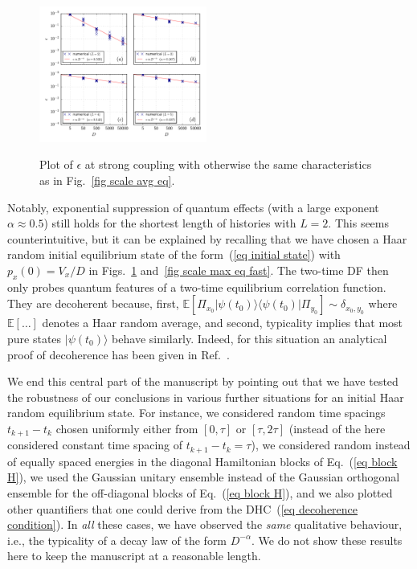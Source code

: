 \documentclass[pre,twocolumn,10pt,aps,longbibliography,nofootinbib]{revtex4-1}
\newcommand{\rl}[0]{{\rangle\langle}}
\newcommand{\new}[1]{#1}
\begin{document}
\begin{figure}[t]
 \centering\includegraphics[width=0.49\textwidth,clip=true]{eps_1_eq.pdf}
 \label{fig scale avg eq fast}\vspace{-0.5cm}
 \caption{Plot of $\epsilon$ at strong coupling with otherwise the same characteristics as in Fig.~\ref{fig scale avg eq}. }
\end{figure}

Notably, exponential suppression of quantum effects (with a large exponent $\alpha\approx0.5$) still
holds for the shortest length of histories with $L=2$. This seems counterintuitive, but it can be explained by
recalling that we have chosen a Haar random initial equilibrium state of the form~(\ref{eq initial state}) with
$p_x(0) = V_x/D$ in Figs.~\ref{fig scale avg eq fast} and~\ref{fig scale max eq fast}.
The two-time DF then only probes quantum features of a two-time equilibrium correlation function. They are \new{decoherent} because, first, $\mathbb{E}[\Pi_{x_0}|\psi(t_0)\rl\psi(t_0)|\Pi_{y_0}] \sim \delta_{x_0,y_0}$ where
$\mathbb{E}[\dots]$ denotes a Haar random average, and second, typicality implies that most pure states
$|\psi(t_0)\rangle$ behave similarly. Indeed, for this situation an analytical proof of \new{decoherence} has been given
in Ref.~\cite{StrasbergEtAlPRA2023}.

We end this central part of the manuscript by pointing out that we have tested the robustness of our conclusions
in various further situations for an initial Haar random equilibrium state. For instance, we considered random time 
spacings $t_{k+1}-t_{k}$ chosen uniformly either from $[0,\tau]$ or $[\tau,2\tau]$ (instead of the here considered 
constant time spacing of $t_{k+1}-t_{k} = \tau$), we considered random instead of equally spaced energies in the 
diagonal Hamiltonian blocks of Eq.~(\ref{eq block H}), we used the Gaussian unitary ensemble instead of the Gaussian 
orthogonal ensemble for the off-diagonal blocks of Eq.~(\ref{eq block H}), and we also plotted other quantifiers that 
one could derive from the DHC~(\ref{eq decoherence condition}). In \emph{all} these cases, we have observed the 
\emph{same} qualitative behaviour, i.e., the typicality of a decay law of the form $D^{-\alpha}$. We do not show these 
results here to keep the manuscript at a reasonable length.
\end{document}
